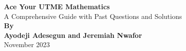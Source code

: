 \documentclass[10pt, a4paper]{book}
\begin{document}
\begin{titlingpage}
\centering
\vspace*{\fill}
\Huge\textbf{Ace Your UTME Mathematics}\\
\vspace{1cm}
\Large{A Comprehensive Guide with Past Questions and Solutions}\\
\vspace{2cm}
\Large\textbf{By}\\
\vspace{0.5cm}
\Large\textbf{Ayodeji Adesegun and Jeremiah Nwafor}\\
\vspace{\fill}
\Large{November 2023}\\
\vspace*{\fill}
\end{titlingpage}
\end{document}
